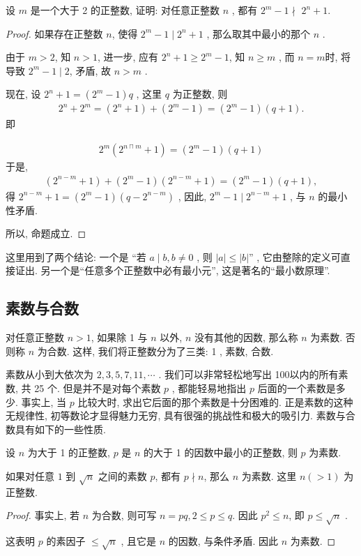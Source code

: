 \begin{example}
	设 $m$ 是一个大于 2 的正整数, 证明: 对任意正整数 $n$ , 都有 $2^{m}-1 \nmid$ $2^{n}+1$.
\end{example}
\begin{proof}
	如果存在正整数 $n$, 使得 $2^{m}-1 \mid 2^{n}+1$ , 那么取其中最小的那个 $n$ .

	由于 $m>2$, 知 $n>1$, 进一步, 应有 $2^{n}+1 \geqslant 2^{m}-1$, 知 $n \geqslant m$ , 而 $n=m$时, 将导致 $2^{m}-1 \mid 2$, 矛盾, 故 $n>m$ .

	现在, 设 $2^{n}+1=\left(2^{m}-1\right) q$ , 这里 $q$ 为正整数, 则
	\begin{align*}
		2^{n}+2^{m}=\left(2^{n}+1\right)+\left(2^{m}-1\right)=\left(2^{m}-1\right)(q+1).
	\end{align*}
	即

	\begin{align*}
		2^{m}\left(2^{n \sqcap m}+1\right)=\left(2^{m}-1\right)(q+1)
	\end{align*}
	于是,
	\begin{align*}
		\left(2^{n-m}+1\right)+\left(2^{m}-1\right)\left(2^{n-m}+1\right)=\left(2^{m}-1\right)(q+1),
	\end{align*}
	得 $2^{n-m}+1=\left(2^{m}-1\right)\left(q-2^{n-m}\right)$ , 因此,  $2^{m}-1 \mid 2^{n-m}+1$ , 与 $n$ 的最小性矛盾.

	所以, 命题成立.
\end{proof}
\begin{note}
	这里用到了两个结论: 一个是 “若 $a \mid b, b \neq 0$ , 则 $|a| \leqslant|b| $” , 它由整除的定义可直接证出. 另一个是“任意多个正整数中必有最小元”, 这是著名的“最小数原理”.
\end{note}

\subsection{素数与合数}
对任意正整数 $n>1$, 如果除 1 与 $n$ 以外,  $n$ 没有其他的因数, 那么称 $n$ 为素数. 否则称 $n$ 为合数. 这样, 我们将正整数分为了三类:  1 , 素数, 合数.

素数从小到大依次为 $2,3,5,7,11, \cdots$ . 我们可以非常轻松地写出 100以内的所有素数, 共 25 个. 但是并不是对每个素数 $p$ , 都能轻易地指出 $p$ 后面的一个素数是多少. 事实上, 当 $p$ 比较大时, 求出它后面的那个素数是十分困难的. 正是素数的这种无规律性, 初等数论才显得魅力无穷, 具有很强的挑战性和极大的吸引力. 素数与合数具有如下的一些性质.

\begin{property}
	设 $n$ 为大于 1 的正整数, $p$ 是 $n$ 的大于 1 的因数中最小的正整数, 则 $p$ 为素数.
\end{property}
\begin{property}
	如果对任意 $1$ 到 $\sqrt{n}$ 之间的素数 $p$, 都有 $p \nmid n$, 那么 $n$ 为素数. 这里 $n(>1)$ 为正整数.
\end{property}
\begin{proof}
	事实上, 若 $n$ 为合数, 则可写 $n=p q, 2 \leqslant p \leqslant q$. 因此 $p^{2} \leqslant n$, 即 $p \leqslant \sqrt{n}$ .


	这表明 $p$ 的素因子 $\leqslant \sqrt{n}$ , 且它是 $n$ 的因数, 与条件矛盾. 因此 $n$ 为素数.
\end{proof}

